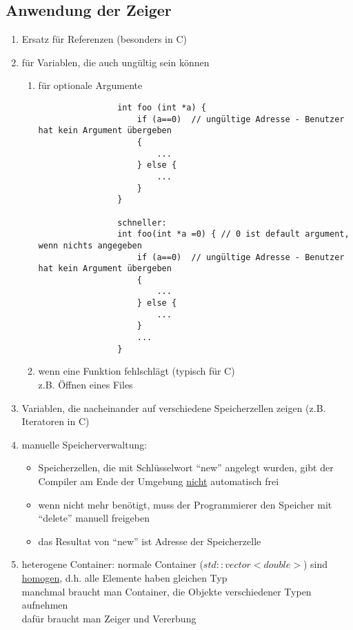 \documentclass{article}
\begin{document}
\subsection{Anwendung der Zeiger}
	\begin{enumerate}
		\item Ersatz für Referenzen (besonders in C)
		\item für Variablen, die auch ungültig sein können
		\begin{enumerate}
			\item für optionale Argumente
			\begin{lstlisting}
				int foo (int *a) {
					if (a==0)  // ungültige Adresse - Benutzer hat kein Argument übergeben	
					{
						...
					} else {
						...
					}
				}

				schneller:
				int foo(int *a =0) { // 0 ist default argument, wenn nichts angegeben
					if (a==0)  // ungültige Adresse - Benutzer hat kein Argument übergeben	
					{
						...
					} else {
						...
					}
					... 
				}
			\end{lstlisting}
			\item wenn eine Funktion fehlschlägt (typisch für C) \\
			z.B. Öffnen eines Files
		\end{enumerate}
		\item Variablen, die nacheinander auf verschiedene Speicherzellen zeigen (z.B. Iteratoren in C)
		\item manuelle Speicherverwaltung:
		\begin{itemize}
			\item Speicherzellen, die mit Schlüsselwort ``new'' angelegt wurden, gibt der Compiler am Ende der Umgebung \underline{nicht} automatisch frei
			\item wenn nicht mehr benötigt, muss der Programmierer den Speicher mit ``delete'' manuell freigeben
			\item das Resultat von ``new'' ist Adresse der Speicherzelle
		\end{itemize}
		\item heterogene Container: normale Container ($std::vector<double>$) sind \underline{homogen}, d.h. alle Elemente haben gleichen Typ \\
		manchmal braucht man Container, die Objekte verschiedener Typen aufnehmen \\
		dafür braucht man Zeiger und Vererbung
	\end{enumerate}
\end{document}

